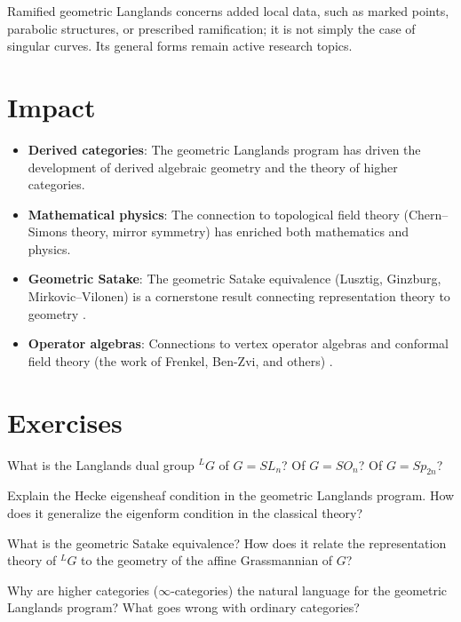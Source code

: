 Ramified geometric Langlands concerns added local data, such as marked points, parabolic structures, or prescribed ramification; it is not simply the case of singular curves. Its general forms remain active research topics.

\section{Impact}

\begin{itemize}
\item \textbf{Derived categories}: The geometric Langlands program has driven the development of derived algebraic geometry and the theory of higher categories.
\item \textbf{Mathematical physics}: The connection to topological field theory (Chern--Simons theory, mirror symmetry) has enriched both mathematics and physics.
\item \textbf{Geometric Satake}: The geometric Satake equivalence (Lusztig, Ginzburg, Mirkovic--Vilonen) is a cornerstone result connecting representation theory to geometry \cite{mirkovic2007}.
\item \textbf{Operator algebras}: Connections to vertex operator algebras and conformal field theory (the work of Frenkel, Ben-Zvi, and others) \cite{frenkel2007}.
\end{itemize}

\section{Exercises}

\begin{exercise}[Basic]
What is the Langlands dual group $^LG$ of $G = SL_n$? Of $G = SO_n$? Of $G = Sp_{2n}$?
\end{exercise}

\begin{exercise}[Intermediate]
Explain the Hecke eigensheaf condition in the geometric Langlands program. How does it generalize the eigenform condition in the classical theory?
\end{exercise}

\begin{exercise}[Challenge]
What is the geometric Satake equivalence? How does it relate the representation theory of $^LG$ to the geometry of the affine Grassmannian of $G$? \cite{mirkovic2007}
\end{exercise}

\begin{exercise}
Why are higher categories ($\infty$-categories) the natural language for the geometric Langlands program? What goes wrong with ordinary categories?
\end{exercise}


